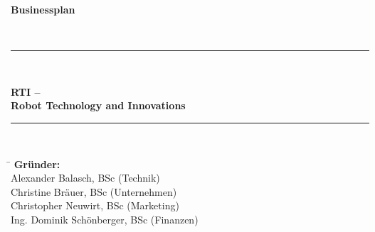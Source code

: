 \begin{titlepage}
	\textbf{{\LARGE Businessplan}}\\
	\begin{figure}[h]
		\centering
	\end{figure}\\
	\rule{15cm}{0.3mm}\\
	\begin{minipage}[c][4cm][c]{\textwidth}
		\centering
		\textbf{\Huge RTI --}\\
		\vspace{\baselineskip}
		\textbf{\Huge Robot Technology and Innovations}
	\end{minipage}
	\rule{15cm}{0.3mm}
	\vspace{2\baselineskip}\\
	\begin{tabbing}
		\hspace{2cm}\=\kill
		\textbf{Gründer:}\> \\ 
		\>Alexander Balasch, BSc (Technik) \\ 
		\>Christine Bräuer, BSc (Unternehmen)\\
		\>Christopher Neuwirt, BSc (Marketing)\\ 
		\>Ing. Dominik Schönberger, BSc (Finanzen) 
	\end{tabbing} 

\end{titlepage}